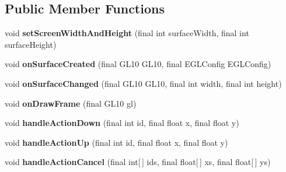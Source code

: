 \subsection*{Public Member Functions}
\begin{DoxyCompactItemize}
\item 
\mbox{\label{classorg_1_1cocos2dx_1_1lib_1_1Cocos2dxRenderer_ade1075a5c025f8c2851f27cc1f35d3a1}} 
void {\bfseries set\+Screen\+Width\+And\+Height} (final int surface\+Width, final int surface\+Height)
\item 
\mbox{\label{classorg_1_1cocos2dx_1_1lib_1_1Cocos2dxRenderer_a8422433297df6e6eeb22ca4236e06bfe}} 
void {\bfseries on\+Surface\+Created} (final G\+L10 G\+L10, final E\+G\+L\+Config E\+G\+L\+Config)
\item 
\mbox{\label{classorg_1_1cocos2dx_1_1lib_1_1Cocos2dxRenderer_a2bf6a27ea1f75cf147481170335c7d22}} 
void {\bfseries on\+Surface\+Changed} (final G\+L10 G\+L10, final int width, final int height)
\item 
\mbox{\label{classorg_1_1cocos2dx_1_1lib_1_1Cocos2dxRenderer_a64efd0cf2f0bc79af287e4129255e0b8}} 
void {\bfseries on\+Draw\+Frame} (final G\+L10 gl)
\item 
\mbox{\label{classorg_1_1cocos2dx_1_1lib_1_1Cocos2dxRenderer_af665cb5400a18987c7e034764540fa63}} 
void {\bfseries handle\+Action\+Down} (final int id, final float x, final float y)
\item 
\mbox{\label{classorg_1_1cocos2dx_1_1lib_1_1Cocos2dxRenderer_aae37b3ceefc7329f3c5813c26c4b97e8}} 
void {\bfseries handle\+Action\+Up} (final int id, final float x, final float y)
\item 
\mbox{\label{classorg_1_1cocos2dx_1_1lib_1_1Cocos2dxRenderer_aae1b7cb69235366730d2d76f0df6d9d1}} 
void {\bfseries handle\+Action\+Cancel} (final int\mbox{[}$\,$\mbox{]} ids, final float\mbox{[}$\,$\mbox{]} xs, final float\mbox{[}$\,$\mbox{]} ys)

\end{DoxyCompactItemize}
